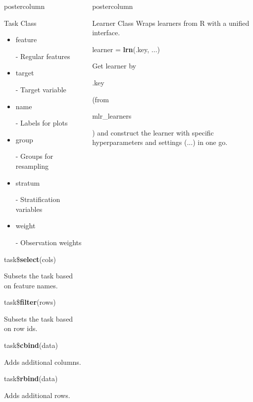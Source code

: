 \documentclass{beamer}
\newlength{\columnheight} %
\newcommand{\codeinline}[1]{\begin{codeboxinline}#1\end{codeboxinline}}
\begin{document}
\begin{frame}[fragile]{}
\begin{columns}
\begin{column}{.245\textwidth}
\begin{beamercolorbox}[center]{postercolumn}
\begin{minipage}{.98\textwidth}
{\begin{myblock}{Task Class}
						\\
						\begin{itemize}
							\item \codeinline{feature} - Regular features
							\item \codeinline{target} - Target variable
							\item \codeinline{name} - Labels for plots
							\item \codeinline{group} -  Groups for resampling
							\item \codeinline{stratum} - Stratification variables
							\item \codeinline{weight} - Observation weights
						\end{itemize}
						\vspace{1em}
						\begin{codebox}
							task\$\textbf{select}(cols)
						\end{codebox}
						Subsets the task based on feature names.
						\\
						\begin{codebox}
							task\$\textbf{filter}(rows)
						\end{codebox}
						Subsets the task based on row ids.
						\\
						\begin{codebox}
							task\$\textbf{cbind}(data)
						\end{codebox}
						Adds additional columns.
						\\
						\begin{codebox}
							task\$\textbf{rbind}(data)
						\end{codebox}
						Adds additional rows.
					\end{myblock}
					\vfill
					}
				\end{minipage}
			\end{beamercolorbox}
		\end{column}
		\begin{column}{.245\textwidth}
			\begin{beamercolorbox}[center]{postercolumn}
				\begin{minipage}{.98\textwidth}
					\parbox[t][\columnheight]{\textwidth}{
						\begin{myblock}{Learner Class}
						Wraps learners from R with a unified interface.
						\\
						\begin{codebox}
							learner = \textbf{lrn}(.key, ...)
						\end{codebox}
						Get learner by \codeinline{.key} (from \codeinline{mlr\_learners}) and construct the learner with specific hyperparameters and settings (...) in one go.

\end{myblock}}
\end{minipage}
\end{beamercolorbox}
\end{column}
\end{columns}
\end{frame}
\end{document}
